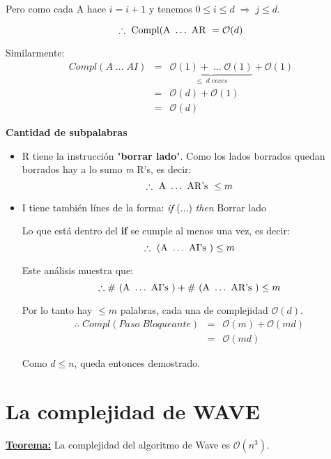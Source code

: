 \documentclass[12pt,a4paper]{report}
\begin{document}
				\par Pero como cada A hace $ i = i + 1$ y tenemos $ 0 \leq \textit{i} \leq \textit{d} \; \Rightarrow \; \textit{j} \leq \textit{d}.$

				\[ \therefore \textup{ Compl(A } \dotsc \textup{ AR } = \mathcal{O}(d) \]

				\par Similarmente:
				\begin{eqnarray}
					\nonumber Compl(A \; \dotsc \; AI) &=& \underbrace{\mathcal{O}(1) + \; \dotsc \; \mathcal{O}(1)}_{\leq \; d \; veces} + \mathcal{O}(1) \\
					\nonumber &=& \mathcal{O}(d) + \mathcal{O}(1) \\
					\nonumber &=& \mathcal{O}(d)
				\end{eqnarray}

			\textbf{Cantidad de subpalabras}
				\begin{itemize}
					\item R tiene la instrucción "\textbf{borrar lado}". Como los lados borrados quedan borrados hay a lo sumo \textit{m} R's, es decir:
					\[ \therefore \textup{ A } \dotsc \textup{ AR's } \leq m \]
					\item I tiene también línes de la forma:
						\textit{if} ($\dotsc$) \textit{then} Borrar lado
					 	\par Lo que está dentro del \textbf{if} se cumple al menos una vez, es decir:
						\[ \therefore \textup{ (A } \dotsc \textup{ AI's }) \leq m \]

					\par Este análisis muestra que:
					\[ \therefore \# \textup{ (A } \dotsc \textup{ AI's }) + \# \textup{ (A } \dotsc \textup{ AR's }) \leq m \]
					\par Por lo tanto hay $\leq m$ palabras, cada una de complejidad $\mathcal{O}(d)$.
					\begin{eqnarray}
						\nonumber \therefore \;  Compl(Paso \; Bloqueante) &=& \mathcal{O}(m) + \mathcal{O}(md) \\
						\nonumber &=& \mathcal{O}(md)
				\end{eqnarray}
				\par Como $d \leq n$, queda entonces demostrado.
				\end{itemize}


	\section{La complejidad de WAVE}
		\textbf{\underline{Teorema:}} La complejidad del algoritmo de Wave es $\mathcal{O}(n^{3})$.
\end{document}
